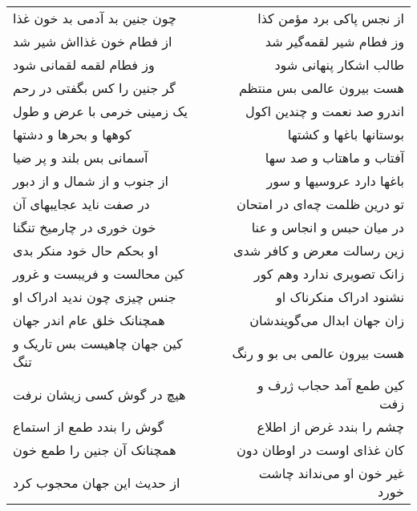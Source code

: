 \begin{center}
\begin{longtable}{l p{0.5cm} r}
چون جنین بد آدمی بد خون غذا
&&
از نجس پاکی برد مؤمن کذا
\\
از فطام خون غذااش شیر شد
&&
وز فطام شیر لقمه‌گیر شد
\\
وز فطام لقمه لقمانی شود
&&
طالب اشکار پنهانی شود
\\
گر جنین را کس بگفتی در رحم
&&
هست بیرون عالمی بس منتظم
\\
یک زمینی خرمی با عرض و طول
&&
اندرو صد نعمت و چندین اکول
\\
کوهها و بحرها و دشتها
&&
بوستانها باغها و کشتها
\\
آسمانی بس بلند و پر ضیا
&&
آفتاب و ماهتاب و صد سها
\\
از جنوب و از شمال و از دبور
&&
باغها دارد عروسیها و سور
\\
در صفت ناید عجایبهای آن
&&
تو درین ظلمت چه‌ای در امتحان
\\
خون خوری در چارمیخ تنگنا
&&
در میان حبس و انجاس و عنا
\\
او بحکم حال خود منکر بدی
&&
زین رسالت معرض و کافر شدی
\\
کین محالست و فریبست و غرور
&&
زانک تصویری ندارد وهم کور
\\
جنس چیزی چون ندید ادراک او
&&
نشنود ادراک منکرناک او
\\
همچنانک خلق عام اندر جهان
&&
زان جهان ابدال می‌گویندشان
\\
کین جهان چاهیست بس تاریک و تنگ
&&
هست بیرون عالمی بی بو و رنگ
\\
هیچ در گوش کسی زیشان نرفت
&&
کین طمع آمد حجاب ژرف و زفت
\\
گوش را بندد طمع از استماع
&&
چشم را بندد غرض از اطلاع
\\
همچنانک آن جنین را طمع خون
&&
کان غذای اوست در اوطان دون
\\
از حدیث این جهان محجوب کرد
&&
غیر خون او می‌نداند چاشت خورد
\\
\end{longtable}
\end{center}
